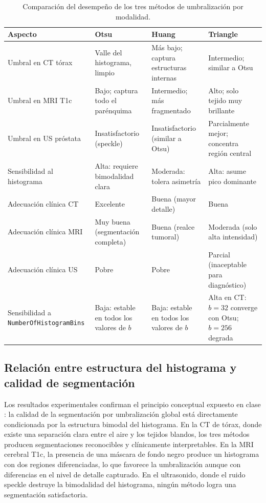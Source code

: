 \documentclass[12pt, a4paper]{article}
\begin{document}
\begin{table}[H]
\centering
\renewcommand{\arraystretch}{1.5}
\begin{tabularx}{\textwidth}{lXXX}
\toprule
\textbf{Aspecto} &
  \textbf{Otsu} &
  \textbf{Huang} &
  \textbf{Triangle} \\
\midrule
Umbral en CT tórax &
  Valle del histograma, limpio &
  Más bajo; captura estructuras internas &
  Intermedio; similar a Otsu \\
Umbral en MRI T1c &
  Bajo; captura todo el parénquima &
  Intermedio; más fragmentado &
  Alto; solo tejido muy brillante \\
Umbral en US próstata &
  Insatisfactorio (speckle) &
  Insatisfactorio (similar a Otsu) &
  Parcialmente mejor; concentra región central \\
Sensibilidad al histograma &
  Alta: requiere bimodalidad clara &
  Moderada: tolera asimetría &
  Alta: asume pico dominante \\
Adecuación clínica CT &
  Excelente &
  Buena (mayor detalle) &
  Buena \\
Adecuación clínica MRI &
  Muy buena (segmentación completa) &
  Buena (realce tumoral) &
  Moderada (solo alta intensidad) \\
Adecuación clínica US &
  Pobre &
  Pobre &
  Parcial (inaceptable para diagnóstico) \\
Sensibilidad a \texttt{NumberOfHistogramBins} &
  Baja: estable en todos los valores de $b$ &
  Baja: estable en todos los valores de $b$ &
  Alta en CT: $b=32$ converge con Otsu; $b=256$ degrada \\
\bottomrule
\end{tabularx}
\caption{Comparación del desempeño de los tres métodos de umbralización por modalidad.}
\label{tab:comparacion}
\end{table}

\subsection{Relación entre estructura del histograma y calidad de segmentación}

Los resultados experimentales confirman el principio conceptual expuesto en clase
\cite{bankman2009}: la calidad de la segmentación por umbralización global está
directamente condicionada por la estructura bimodal del histograma. En la CT de tórax,
donde existe una separación clara entre el aire y los tejidos blandos, los tres métodos
producen segmentaciones reconocibles y clínicamente interpretables. En la MRI cerebral
T1c, la presencia de una máscara de fondo negro produce un histograma con dos regiones
diferenciadas, lo que favorece la umbralización aunque con diferencias en el nivel de
detalle capturado. En el ultrasonido, donde el ruido speckle destruye la bimodalidad
del histograma, ningún método logra una segmentación satisfactoria.
\end{document}
